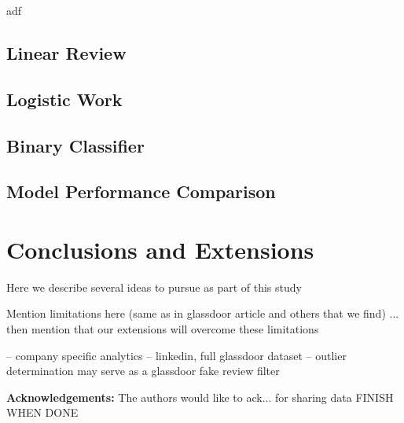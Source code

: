 \documentclass[10pt]{article}
\begin{document}
adf

\subsection{Linear Review}


\subsection{Logistic Work}


\subsection{Binary Classifier}

\subsection{Model Performance Comparison}

\section{Conclusions and Extensions}


Here we describe several ideas to pursue as part of this study

Mention limitations here (same as in glassdoor article and others that we find) ... then 
mention that our extensions will overcome these limitations 

-- company specific analytics 
-- linkedin, full glassdoor dataset 
-- outlier determination may serve as a glassdoor fake review filter 



\textbf{Acknowledgements:} The authors would like to ack... for sharing data FINISH WHEN DONE




\end{document}
